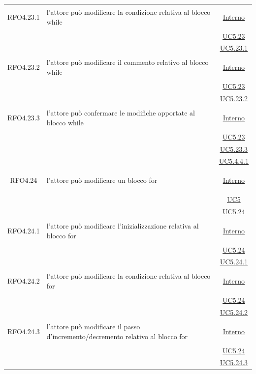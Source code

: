 \begin{longtable}{|c|>{\centering}m{7cm}|c|}
\hypertarget{RFO4.23.1}{RFO4.23.1} & l'attore può modificare la condizione relativa al blocco while &  \hyperlink{Interno}{Interno}\\
& &\hyperref[UC5.23]{UC5.23}\\
& &\hyperref[UC5.23.1]{UC5.23.1}\\ \hline

\hypertarget{RFO4.23.2}{RFO4.23.2} & l'attore può modificare il commento relativo al blocco while &  \hyperlink{Interno}{Interno}\\
& &\hyperref[UC5.23]{UC5.23}\\
& &\hyperref[UC5.23.2]{UC5.23.2}\\ \hline

\hypertarget{RFO4.23.3}{RFO4.23.3} & l'attore può confermare le modifiche apportate al blocco while &  \hyperlink{Interno}{Interno}\\
& &\hyperref[UC5.23]{UC5.23}\\
& &\hyperref[UC5.23.3]{UC5.23.3}\\
& &\hyperref[UC5.4.4.1]{UC5.4.4.1}\\ \hline

\hypertarget{RFO4.24}{RFO4.24} & l'attore può modificare un blocco for &  \hyperlink{Interno}{Interno}\\
& &\hyperref[UC5]{UC5}\\
& &\hyperref[UC5.24]{UC5.24}\\ \hline

\hypertarget{RFO4.24.1}{RFO4.24.1} & l'attore può modificare l'inizializzazione relativa al blocco for &  \hyperlink{Interno}{Interno}\\
& &\hyperref[UC5.24]{UC5.24}\\
& &\hyperref[UC5.24.1]{UC5.24.1}\\ \hline

\hypertarget{RFO4.24.2}{RFO4.24.2} & l'attore può modificare la condizione relativa al blocco for &  \hyperlink{Interno}{Interno}\\
& &\hyperref[UC5.24]{UC5.24}\\
& &\hyperref[UC5.24.2]{UC5.24.2}\\ \hline

\hypertarget{RFO4.24.3}{RFO4.24.3} & l'attore può modificare il passo d'incremento/decremento relativo al blocco for &  \hyperlink{Interno}{Interno}\\
& &\hyperref[UC5.24]{UC5.24}\\
& &\hyperref[UC5.24.3]{UC5.24.3}\\ \hline


\end{longtable}
